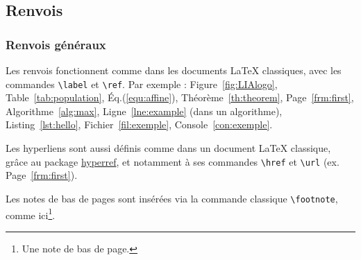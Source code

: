 \documentclass[10pt,    %
    french,             %
    xcolor=table,       %
    envcountsect,       %
    aspectratio=43      %
]{beamer}
\begin{document}
\subsection{Renvois}
\begin{frame}
    \frametitle{Renvois généraux} 
    
    Les renvois fonctionnent comme dans les documents \LaTeX{} classiques, avec les commandes \texttt{\textbackslash{}label} et \texttt{\textbackslash{}ref}. Par exemple : Figure~\ref{fig:LIAlogo}, Table~\ref{tab:population}, Éq.(\ref{equ:affine}), Théorème~\ref{th:theorem}, Page~\ref{frm:first}, Algorithme~\ref{alg:max}, Ligne~\ref{lne:example} (dans un algorithme), Listing~\ref{lst:hello}, Fichier~\ref{fil:exemple}, Console~\ref{con:exemple}.
    
    \vspace{0.25cm}
    Les hyperliens sont aussi définis comme dans un document \LaTeX{} classique, grâce au package \href{https://ctan.org/pkg/hyperref?lang=en}{hyperref}, et notamment à ses commandes \texttt{\textbackslash{}href} et \texttt{\textbackslash{}url} (ex. Page~\ref{frm:first}).
    
    \vspace{0.25cm}
    Les notes de bas de pages sont insérées via la commande classique \texttt{\textbackslash{}footnote}, comme ici\footnote{Une note de bas de page.}.
\end{frame}
\end{document}
